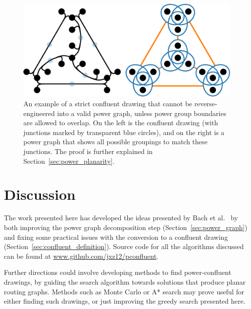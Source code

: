 \begin{figure}
  \centering
  \includegraphics[width=\linewidth]{power/stricter.pdf}
  \caption[A strict confluent drawing that is not power-confluent]{An example of a strict confluent drawing that cannot be reverse-engineered into a valid power graph, unless power group boundaries are allowed to overlap. On the left is the confluent drawing (with junctions marked by transparent blue circles), and on the right is a power graph that shows all possible groupings to match these junctions. The proof is further explained in Section~\ref{sec:power_planarity}.}
  \label{fig:strict}
\end{figure}

\section{Discussion}
\label{sec:power_discussion}
The work presented here has developed the ideas presented by Bach et al.\ \cite{Bach2017} by both improving the power graph decomposition step (Section~\ref{sec:power_graph}) and fixing some practical issues with the conversion to a confluent drawing (Section~\ref{sec:confluent_definition}). Source code for all the algorithms discussed can be found at \url{www.github.com/jxz12/pconfluent}.

Further directions could involve developing methods to find power-confluent drawings, by guiding the search algorithm towards solutions that produce planar routing graphs.
Methods such as Monte Carlo or A* search may prove useful for either finding such drawings, or just improving the greedy search presented here.

